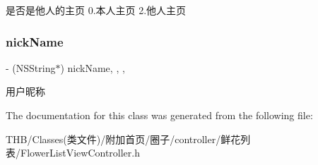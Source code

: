 是否是他人的主页 0.本人主页 2.他人主页 \mbox{\label{interface_flower_list_view_controller_ac46546da2c2696f73e99921a97c94a57}} 
\subsubsection{\texorpdfstring{nick\+Name}{nickName}}
{\footnotesize\ttfamily -\/ (N\+S\+String$\ast$) nick\+Name\hspace{0.3cm}{\ttfamily [read]}, {\ttfamily [write]}, {\ttfamily [nonatomic]}, {\ttfamily [strong]}}

用户昵称 

The documentation for this class was generated from the following file\+:\begin{DoxyCompactItemize}
\item 
T\+H\+B/\+Classes(类文件)/附加首页/圈子/controller/鲜花列表/Flower\+List\+View\+Controller.\+h\end{DoxyCompactItemize}
